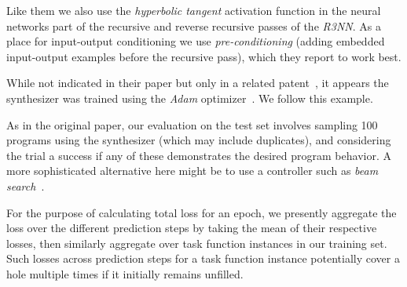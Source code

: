 \documentclass{article}
\begin{document}
Like them we also use the \emph{hyperbolic tangent} activation function in the neural networks part of the recursive and reverse recursive passes of the \emph{R3NN}.
As a place for input-output conditioning we use \emph{pre-conditioning}
(adding embedded input-output examples before the recursive pass),
which they report to work best.

While not indicated in their paper but only in a related patent~\citep{mohamed2017neural},
it appears the synthesizer was trained using the \emph{Adam} optimizer~\citep{kingma2014adam}.
We follow this example.

As in the original paper,
our evaluation on the test set involves sampling 100 programs using the synthesizer (which may include duplicates),
and considering the trial a success if any of these demonstrates the desired program behavior.
A more sophisticated alternative here might be to use a controller such as \emph{beam search}~\citep{polosukhin2018neural}.


For the purpose of calculating total loss for an epoch,
we presently aggregate the loss over the different
prediction steps by taking the mean of their respective losses,
then similarly aggregate over task function instances in our training set.
Such losses across prediction steps for a task function instance
potentially cover a hole multiple times if it initially remains unfilled.

\end{document}
